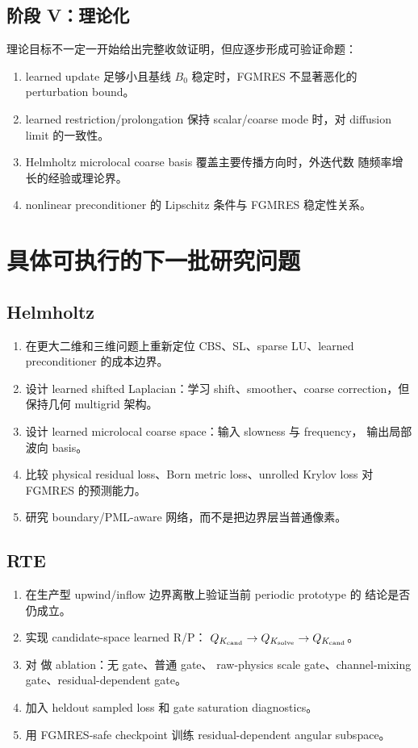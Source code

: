 \documentclass[UTF8,11pt,fontset=fandol]{ctexart}
\newcommand{\code}[1]{\texttt{\detokenize{#1}}}
\begin{document}
\subsection{阶段 V：理论化}

理论目标不一定一开始给出完整收敛证明，但应逐步形成可验证命题：
\begin{enumerate}[leftmargin=2em]
  \item learned update 足够小且基线 \(B_0\) 稳定时，FGMRES 不显著恶化的
  perturbation bound。
  \item learned restriction/prolongation 保持 scalar/coarse mode 时，对
  diffusion limit 的一致性。
  \item Helmholtz microlocal coarse basis 覆盖主要传播方向时，外迭代数
  随频率增长的经验或理论界。
  \item nonlinear preconditioner 的 Lipschitz 条件与 FGMRES 稳定性关系。
\end{enumerate}

\section{具体可执行的下一批研究问题}

\subsection{Helmholtz}

\begin{enumerate}[leftmargin=2em]
  \item 在更大二维和三维问题上重新定位 CBS、SL、sparse LU、learned
  preconditioner 的成本边界。
  \item 设计 learned shifted Laplacian：学习 shift、smoother、coarse
  correction，但保持几何 multigrid 架构。
  \item 设计 learned microlocal coarse space：输入 slowness 与 frequency，
  输出局部波向 basis。
  \item 比较 physical residual loss、Born metric loss、unrolled Krylov
  loss 对 FGMRES 的预测能力。
  \item 研究 boundary/PML-aware 网络，而不是把边界层当普通像素。
\end{enumerate}

\subsection{RTE}

\begin{enumerate}[leftmargin=2em]
  \item 在生产型 upwind/inflow 边界离散上验证当前 periodic prototype 的
  结论是否仍成立。
  \item 实现 candidate-space learned R/P：
  \(Q_{K_{\rm cand}}\to Q_{K_{\rm solve}}\to Q_{K_{\rm cand}}\)。
  \item 对 \code{scale-aware-gates} 做 ablation：无 gate、普通 gate、
  raw-physics scale gate、channel-mixing gate、residual-dependent gate。
  \item 加入 heldout sampled loss 和 gate saturation diagnostics。
  \item 用 FGMRES-safe checkpoint 训练 residual-dependent angular subspace。
\end{enumerate}
\end{document}
